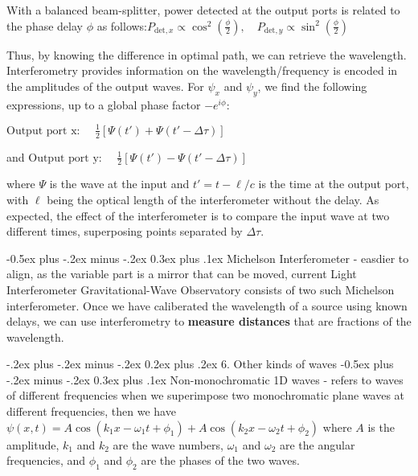 \documentclass[a4paper,11pt,portrait]{article}
\makeatletter
\renewcommand{\section}{\@startsection{section}{1}{0mm}%
                            {-.2ex plus -.2ex minus -.2ex}%
                            {0.2ex plus .2ex}%
                            {\normalfont\tiny\bfseries}}
\renewcommand{\subsection}{\@startsection{subsection}{2}{0mm}%
                                {-0.5ex plus -.2ex minus -.2ex}%
                                {0.3ex plus .1ex}%
                                {\normalfont\footnotesize\bfseries}}
\makeatother
\begin{document}
\begin{multicols}{3}
With a balanced beam-splitter, power detected at the output ports is related to the phase delay \( \phi \) as follows:$P_{\text{det},x} \propto \cos^2 \left( \frac{\phi}{2} \right), \quad P_{\text{det},y} \propto \sin^2 \left( \frac{\phi}{2} \right) 
$

Thus, by knowing the difference in optimal path, we can retrieve the wavelength. Interferometry provides information on the wavelength/frequency is encoded in the amplitudes of the output waves.
For  \( \psi_x \) and \( \psi_y \), we find the following expressions, up to a global phase factor \( -e^{i\phi} \):

$\text{Output port x: } \quad \frac{1}{2} \left[ \Psi(t') + \Psi(t' - \Delta \tau) \right]$

and
$\text{Output port y: } \quad \frac{1}{2} \left[ \Psi(t') - \Psi(t' - \Delta \tau) \right]$

where \( \Psi \) is the wave at the input and \( t' = t - \ell/c \) is the time at the output port, with \( \ell \) being the optical length of the interferometer without the delay. As expected, the effect of the interferometer is to compare the input wave at two different times, superposing points separated by \( \Delta \tau \).

\subsection{Michelson Interferometer} - easdier to align, as the variable part is a mirror that can be moved, current Light Interferometer Gravitational-Wave Observatory consists of two such Michelson interferometer. Once we have caliberated the wavelength of a source using known delays, we can use interferometry to \textbf{measure distances} that are fractions of the wavelength.

\section{6. Other kinds of waves}
\subsection{Non-monochromatic 1D waves} - refers to waves of different frequencies
when we superimpose two monochromatic plane waves at different frequencies, then we have $\psi(x,t) = A \cos(k_1 x - \omega_1 t + \phi_1) + A \cos(k_2 x - \omega_2 t + \phi_2)$
where \( A \) is the amplitude, \( k_1 \) and \( k_2 \) are the wave numbers, \( \omega_1 \) and \( \omega_2 \) are the angular frequencies, and \( \phi_1 \) and \( \phi_2 \) are the phases of the two waves.


\end{multicols}
\end{document}

